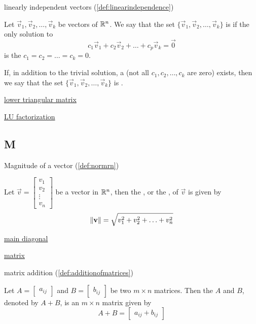 \documentclass{ximera}
\begin{document}
linearly independent vectors (\ref{def:linearindependence})
\begin{expandable}
    Let $\vec{v}_1, \vec{v}_2,\ldots ,\vec{v}_k$ be vectors of $\mathbb{R}^n$.  We say that the set $\{\vec{v}_1, \vec{v}_2,\ldots ,\vec{v}_k\}$ is  if the only solution to 
\begin{equation}c_1\vec{v}_1+c_2\vec{v}_2+\ldots +c_p\vec{v}_k=\vec{0}\end{equation}
is the  $c_1=c_2=\ldots =c_k=0$.

If, in addition to the trivial solution, a  (not all $c_1, c_2,\ldots ,c_k$ are zero) exists, then we say that the set $\{\vec{v}_1, \vec{v}_2,\ldots ,\vec{v}_k\}$ is .
\end{expandable}

\href{https://ximera.osu.edu/oerlinalg/LinearAlgebra/MAT-0070/main}{lower triangular matrix}

\href{https://ximera.osu.edu/oerlinalg/LinearAlgebra/MAT-0070/main}{LU factorization}

\subsection{M}
Magnitude of a vector (\ref{def:normrn})
\begin{expandable}
Let $\vec{v}=\begin{bmatrix}v_1\\ v_2\\ \vdots \\v_n\end{bmatrix}$ be a vector in $\mathbb{R}^n$, then the , or the , of $\vec{v}$ is given by
$$  \left\lVert\mathbf{v}\right\rVert=\sqrt{v_1^2+v_2^2+\ldots +v_n^2}$$
\end{expandable}

\href{https://ximera.osu.edu/oerlinalg/LinearAlgebra/MAT-0010/main}{main diagonal}
    
\href{https://ximera.osu.edu/oerlinalg/LinearAlgebra/MAT-0010/main}{matrix}

matrix addition (\ref{def:additionofmatrices})
\begin{expandable}
    Let $A=\begin{bmatrix} a_{ij}\end{bmatrix} $ and $B=\begin{bmatrix} b_{ij}\end{bmatrix}$ be two
$m\times n$ matrices. Then the  $A$ and $B$, denoted by $A+B$,  is an $m \times n$
matrix  given by 
$$A+B=\begin{bmatrix}a_{ij}+b_{ij}\end{bmatrix}$$
\end{expandable}
\end{document}
